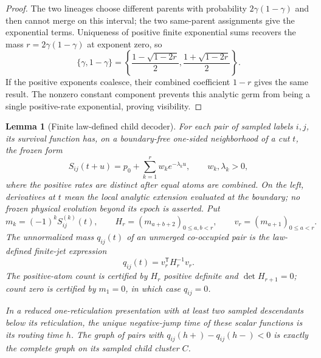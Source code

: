 \documentclass[11pt]{article}
\newtheorem{lemma}[theorem]{Lemma}
\begin{document}
\begin{proof}
The two lineages choose different parents with probability $2\gamma(1-\gamma)$ and then cannot merge on this interval; the two same-parent assignments give the exponential terms.  Uniqueness of positive finite exponential sums recovers the mass $r=2\gamma(1-\gamma)$ at exponent zero, so
\[
\{\gamma,1-\gamma\}
=\left\{\frac{1-\sqrt{1-2r}}2,\frac{1+\sqrt{1-2r}}2\right\}.
\]
If the positive exponents coalesce, their combined coefficient $1-r$ gives the same result.  The nonzero constant component prevents this analytic germ from being a single positive-rate exponential, proving visibility.
\end{proof}

\begin{lemma}[Finite law-defined child decoder]
\label{lem:finite-child-decoder}
For each pair of sampled labels $i,j$, its survival function has, on a boundary-free one-sided neighborhood of a cut $t$, the frozen form
\[
S_{ij}(t+u)=p_0+\sum_{k=1}^{r}w_k e^{-\lambda_k u},
\qquad w_k,\lambda_k>0,
\]
where the positive rates are distinct after equal atoms are combined.  On the left, derivatives at $t$ mean the local analytic extension evaluated at the boundary; no frozen physical evolution beyond its epoch is asserted.  Put
\[
m_k=(-1)^kS_{ij}^{(k)}(t),\qquad
H_r=(m_{a+b+2})_{0\le a,b<r},\qquad
v_r=(m_{a+1})_{0\le a<r}.
\]
The unnormalized mass $q_{ij}(t)$ of an unmerged co-occupied pair is the law-defined finite-jet expression
\begin{equation}
q_{ij}(t)=v_r^{\mathsf T}H_r^{-1}v_r.
\label{eq:finite-child-q}
\end{equation}
The positive-atom count is certified by $H_r$ positive definite and $\det H_{r+1}=0$; count zero is certified by $m_1=0$, in which case $q_{ij}=0$.

In a reduced one-reticulation presentation with at least two sampled descendants below its reticulation, the unique negative-jump time of these scalar functions is its routing time $h$.  The graph of pairs with $q_{ij}(h+)-q_{ij}(h-)<0$ is exactly the complete graph on its sampled child cluster $C$.
\end{lemma}
\end{document}

